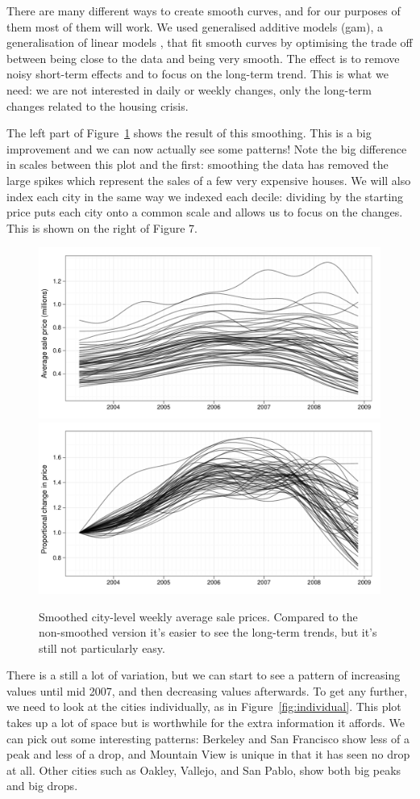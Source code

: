 \documentclass[oneside]{article}
\begin{document}
There are many different ways to create smooth curves, and for our purposes of them most of them will work.  We used generalised additive models ({\sc gam}), a generalisation of linear models \citep{wood:2006}, that fit smooth curves by optimising the trade off between being close to the data and being very smooth. The effect is to remove noisy short-term effects and to focus on the long-term trend.  This is what we need: we are not interested in daily or weekly changes, only the long-term changes related to the housing crisis.

The left part of Figure~\ref{fig:smoothed} shows the result of this smoothing. This is a big improvement and we can now actually see some patterns! Note the big difference in scales between this plot and the first: smoothing the data has removed the large spikes which represent the sales of a few very expensive houses. We will also index each city in the same way we indexed each decile: dividing by the starting price puts each city onto a common scale and allows us to focus on the changes.  This is shown on the right of Figure 7.  

\begin{figure}[htbp]
  \centering
  \includegraphics[width=0.5 \linewidth]{cities-smooth}%
  \includegraphics[width=0.5 \linewidth]{cities-indexed}
  \caption{Smoothed city-level weekly average sale prices.  Compared to the non-smoothed version it's easier to see the long-term trends, but it's still not particularly easy.}
  \label{fig:smoothed}
\end{figure}

There is a still a lot of variation, but we can start to see a pattern of increasing values until mid 2007, and then decreasing values afterwards.  To get any further, we need to look at the cities individually, as in Figure~\ref{fig:individual}.  This plot takes up a lot of space but is worthwhile for the extra information it affords.  We can pick out some interesting patterns: Berkeley and San Francisco show less of a peak and less of a drop, and Mountain View is unique in that it has seen no drop at all.  Other cities such as Oakley, Vallejo, and San Pablo, show both big peaks and big drops.
\end{document}
